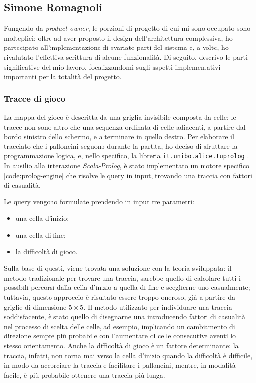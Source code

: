 \subsection{Simone Romagnoli}
Fungendo da \textit{product owner}, le porzioni di progetto di cui mi sono occupato sono molteplici: oltre ad aver
proposto il design dell'architettura complessiva, ho partecipato all'implementazione di svariate parti del sistema e, a
volte, ho rivalutato l'effettiva scrittura di alcune funzionalità. Di seguito, descrivo le parti significative del mio
lavoro, focalizzandomi sugli aspetti implementativi importanti per la totalità del progetto.

\subsubsection{Tracce di gioco}
La mappa del gioco è descritta da una griglia invisibile composta da celle: le tracce non sono altro
che una sequenza ordinata di celle adiacenti, a partire dal bordo sinistro dello schermo, e a terminare in quello
destro. Per elaborare il tracciato che i palloncini seguono durante la partita, ho deciso di sfruttare la programmazione
logica, e, nello specifico, la libreria \texttt{it.unibo.alice.tuprolog} \cite{tp}. In ausilio alla interazione
\textit{Scala-Prolog}, è stato implementato un motore specifico \ref{code:prolog-engine} che risolve le query in input,
trovando una traccia con fattori di casualità.



Le query vengono formulate prendendo in input tre parametri:
\begin{itemize}
    \item una cella d'inizio;
    \item una cella di fine;
    \item la difficoltà di gioco.
\end{itemize}

Sulla base di questi, viene trovata una soluzione con la teoria sviluppata: il metodo tradizionale per trovare una
traccia, sarebbe quello di calcolare tutti i possibili percorsi dalla cella d'inizio a quella di fine e sceglierne uno
casualmente; tuttavia, questo approccio è risultato essere troppo oneroso, già a partire da griglie di dimensione
$5 \times 5$. Il metodo utilizzato per individuare una traccia soddisfacente, è stato quello di disegnarne una
introducendo fattori di casualità nel processo di scelta delle celle, ad esempio, implicando un cambiamento di direzione
sempre più probabile con l'aumentare di celle consecutive aventi lo stesso orientamento. Anche la difficoltà di gioco
è un fattore determinante: la traccia, infatti, non torna mai verso la cella d'inizio quando la difficoltà è difficile,
in modo da accorciare la traccia e facilitare i palloncini, mentre, in modalità facile, è più probabile ottenere una
traccia più lunga.

